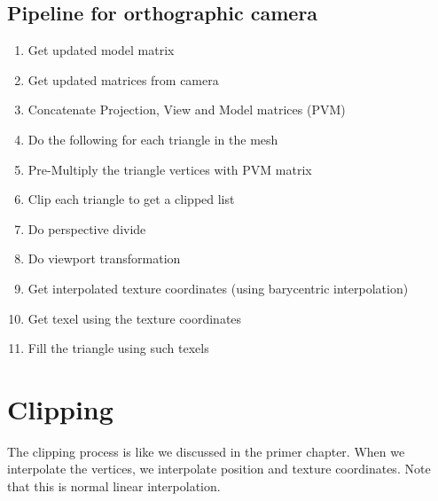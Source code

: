 \subsection{Pipeline for orthographic camera}
\begin{enumerate}
    \item Get updated model matrix
    \item Get updated matrices from camera
    \item Concatenate Projection, View and Model matrices (PVM)
    \item Do the following for each triangle in the mesh
	\item Pre-Multiply the triangle vertices with PVM matrix
	\item Clip each triangle to get a clipped list
	\item Do perspective divide
	\item Do viewport transformation
	\item Get interpolated texture coordinates (using barycentric interpolation)
	\item Get texel using the texture coordinates
	\item Fill the triangle using such texels
\end{enumerate}

\section{Clipping}
The clipping process is like we discussed in the primer chapter. When we interpolate the vertices,  we interpolate position and texture coordinates. Note that this is normal linear interpolation.

\clearpage 